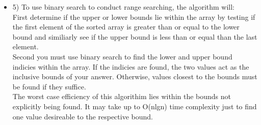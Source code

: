 \documentclass[ 12pt ]{article}
\begin{document}
\begin{itemize}
	\item[] {5) \large}
	To use binary search to conduct range searching, the algorithm will: \\
	First determine if the upper or lower bounds lie within the array by testing if the first element of the sorted array is greater than or equal to the lower bound
	and similiarly see if the upper bound is less than or equal than the last element. \\
	Second you must use binary search to find the lower and upper bound indicies within the array. If the indicies are found, the two values act as the inclusive bounds of
	your answer. Otherwise, values closest to the bounds must be found if they suffice. \\
	The worst case efficiency of this algorithim lies within the bounds not explicitly being found. It may take up to O(nlgn) time complexity just to find one value desireable 
	to the respective bound.

\end{itemize}
\end{document}
